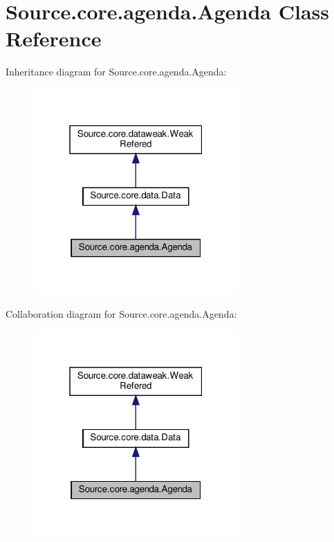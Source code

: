 \hypertarget{classSource_1_1core_1_1agenda_1_1Agenda}{}\section{Source.\+core.\+agenda.\+Agenda Class Reference}
\label{classSource_1_1core_1_1agenda_1_1Agenda}


Inheritance diagram for Source.\+core.\+agenda.\+Agenda\+:\nopagebreak
\begin{figure}[H]
\begin{center}
\leavevmode
\includegraphics[width=223pt]{classSource_1_1core_1_1agenda_1_1Agenda__inherit__graph}
\end{center}
\end{figure}


Collaboration diagram for Source.\+core.\+agenda.\+Agenda\+:\nopagebreak
\begin{figure}[H]
\begin{center}
\leavevmode
\includegraphics[width=223pt]{classSource_1_1core_1_1agenda_1_1Agenda__coll__graph}
\end{center}
\end{figure}
